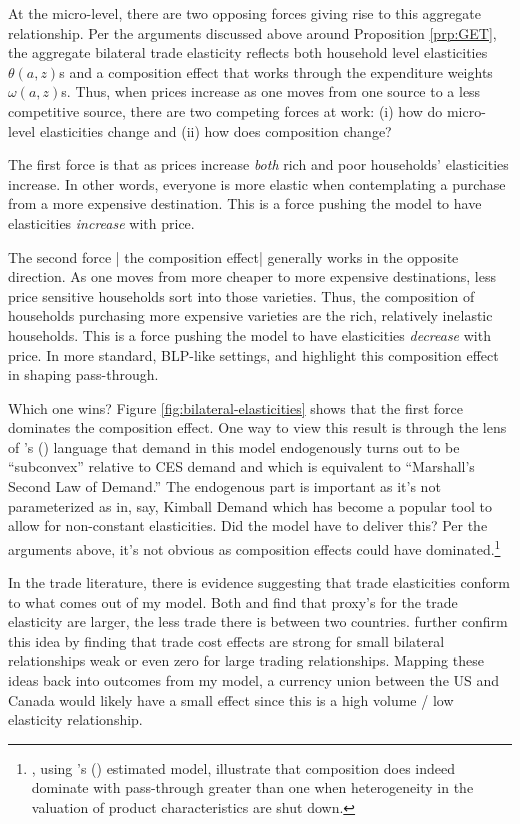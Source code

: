 \documentclass[12pt,pdftex]{article}
\def\citeapos#1{\citeauthor{#1}'s (\citeyear{#1})}
\begin{document}
\begin{onehalfspacing}
At the micro-level, there are two opposing forces giving rise to this aggregate relationship. Per the arguments discussed above around Proposition \ref{prp:GET}, the aggregate bilateral trade elasticity reflects both household level elasticities $\theta(a,z)$s and a composition effect that works through the expenditure weights $\omega(a,z)$s. Thus, when prices increase as one moves from one source to a less competitive source, there are two competing forces at work: (i) how do micro-level elasticities change and (ii) how does composition change?

The first force is that as prices increase \emph{both} rich and poor households' elasticities increase. In other words, everyone is more elastic when contemplating a purchase from a more expensive destination. This is a force pushing the model to have elasticities \emph{increase} with price.

The second force | the composition effect| generally works in the opposite direction. As one moves from more cheaper to more expensive destinations, less price sensitive households sort into those varieties. Thus, the composition of households purchasing more expensive varieties are the rich, relatively inelastic households. This is a force pushing the model to have elasticities \emph{decrease} with price. In more standard, BLP-like settings, \citet{nakamura2010accounting} and \citet*{head2021poor} highlight this composition effect in shaping pass-through.

Which one wins? Figure \ref{fig:bilateral-elasticities} shows that the first force dominates the composition effect. One way to view this result is through the lens of \citeapos{mrazova2017not} language that demand in this model endogenously turns out to be ``subconvex'' relative to CES demand and which is equivalent to ``Marshall's Second Law of Demand.'' The endogenous part is important as it's not parameterized as in, say, Kimball Demand which has become a popular tool to allow for non-constant elasticities. Did the model have to deliver this? Per the arguments above, it's not obvious as composition effects could have dominated.\footnote{\citet{head2021poor}, using \citeapos{berry1995automobile} estimated model, illustrate that composition does indeed dominate with pass-through greater than one when heterogeneity in the valuation of product characteristics are shut down.}

In the trade literature, there is evidence suggesting that trade elasticities conform to what comes out of my model. Both \citet{novy2013international} and \citet*{carrere2020gravity} find that proxy's for the trade elasticity are larger, the less trade there is between two countries. \citet{chen2022gravity} further confirm this idea by finding that trade cost effects are strong for small bilateral relationships weak or even zero for large trading relationships. Mapping these ideas back into outcomes from my model, a currency union between the US and Canada would likely have a small effect since this is a high volume / low elasticity relationship.


\end{onehalfspacing}
\end{document}
